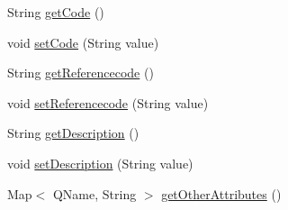 \begin{DoxyCompactItemize}
\item 
String \hyperlink{classcom_1_1telefonica_1_1schemas_1_1unica_1_1rpc_1_1payment_1_1v1_1_1PaymentInfoType_a32641f3bdd7a04da429454888d5ae792}{getCode} ()
\item 
void \hyperlink{classcom_1_1telefonica_1_1schemas_1_1unica_1_1rpc_1_1payment_1_1v1_1_1PaymentInfoType_a0867a241b487b88ff1fd0d467e1e8d4e}{setCode} (String value)
\item 
String \hyperlink{classcom_1_1telefonica_1_1schemas_1_1unica_1_1rpc_1_1payment_1_1v1_1_1PaymentInfoType_a8d84cdd54ec9b1f1470b53aab0bce64e}{getReferencecode} ()
\item 
void \hyperlink{classcom_1_1telefonica_1_1schemas_1_1unica_1_1rpc_1_1payment_1_1v1_1_1PaymentInfoType_a54a6aaae0e7b13f7ff569dbda864c90d}{setReferencecode} (String value)
\item 
String \hyperlink{classcom_1_1telefonica_1_1schemas_1_1unica_1_1rpc_1_1payment_1_1v1_1_1PaymentInfoType_a8a3095a0eb8d038ee09576ece2c3307e}{getDescription} ()
\item 
void \hyperlink{classcom_1_1telefonica_1_1schemas_1_1unica_1_1rpc_1_1payment_1_1v1_1_1PaymentInfoType_a7c48c6dc65f4d4dc1b0dab03a201520d}{setDescription} (String value)
\item 
Map$<$ QName, String $>$ \hyperlink{classcom_1_1telefonica_1_1schemas_1_1unica_1_1rpc_1_1payment_1_1v1_1_1PaymentInfoType_a20a67d5f436356fcb552cf23aeca7635}{getOtherAttributes} ()
\end{DoxyCompactItemize}
